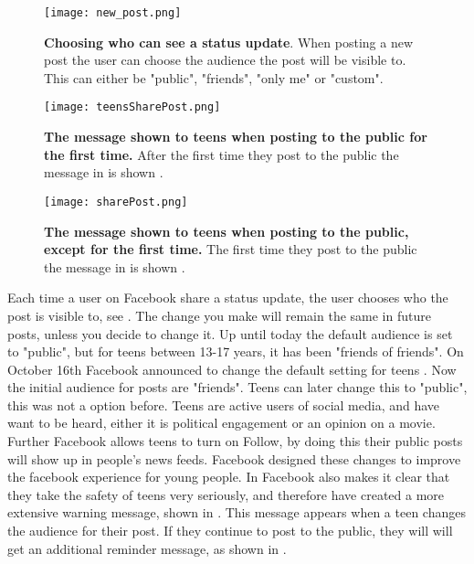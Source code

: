 \begin{figure}[h!]
\centering
\texttt{[image: new\_post.png]}
\caption[Choosing who can see a status update.]{\textbf{Choosing who can see a status update}. When posting a new post the user can choose the audience the post will be visible to. This can either be "public", "friends", "only me" or "custom".} 
\label{fig:newPost}
\end{figure}

\begin{figure}[h!]
\centering
\texttt{[image: teensSharePost.png]}
\caption[The message shown to teens when posting to the public for the first time]{\textbf{The message shown to teens when posting to the public for the first time.} After the first time they post to the public the message in  is shown \cite{defaultTeens}.} 
\label{fig:teensSharePost}
\end{figure}

\begin{figure}[h!]
\centering
\texttt{[image: sharePost.png]}
\caption [The message shown to teens when posting to the public, except for the first time]{\textbf{The message shown to teens when posting to the public, except for the first time.} The first time they post to the public the message in  is shown \cite{defaultTeens}.} 
\label{fig:sharePost}
\end{figure}

Each time a user on Facebook share a status update, the user chooses who the post is visible to, see . The change you make will remain the same in future posts, unless you decide to change it. Up until today the default audience is set to "public", but for teens between 13-17 years, it has been "friends of friends". On October 16th Facebook announced to change the default setting for teens \cite{defaultTeens}. Now the initial audience for posts are "friends". Teens can later change this to "public", this was not a option before. Teens are active users of social media, and have want to be heard, either it is political engagement or an opinion on a movie. Further Facebook allows teens to turn on Follow, by doing this their public posts will show up in people's news feeds. Facebook designed these changes to improve the facebook experience for young people. In \cite{defaultTeens} Facebook also makes it clear that they take the safety of teens very seriously, and therefore have created a more extensive warning message, shown in  . This message appears when a teen changes the audience for their post. If they continue to post to the public, they will will get an additional reminder message, as shown in  .

